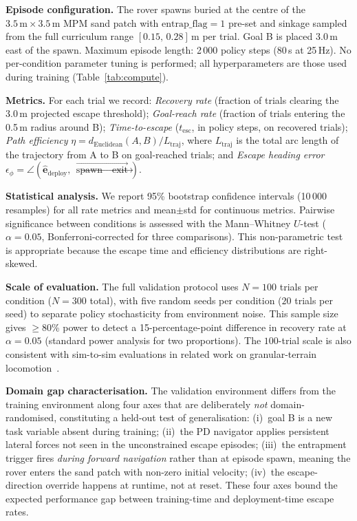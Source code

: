 \documentclass[conference]{IEEEtran}
\begin{document}
\textbf{Episode configuration.}
The rover spawns buried at the centre of the $3.5\,\text{m}\times3.5\,\text{m}$
MPM sand patch with $\text{entrap\_flag}=1$ pre-set and sinkage sampled from
the full curriculum range $[0.15,\,0.28]$\,m per trial. Goal B is placed
$3.0$\,m east of the spawn. Maximum episode length: 2\,000 policy steps
($80$\,s at 25\,Hz). No per-condition parameter tuning is performed; all
hyperparameters are those used during training (Table~\ref{tab:compute}).

\textbf{Metrics.}
For each trial we record: \emph{Recovery rate} (fraction of trials clearing
the 3.0\,m projected escape threshold); \emph{Goal-reach rate} (fraction of
trials entering the 0.5\,m radius around B); \emph{Time-to-escape}
($t_\text{esc}$, in policy steps, on recovered trials);
\emph{Path efficiency} $\eta = d_\text{Euclidean}(A,B) / L_\text{traj}$,
where $L_\text{traj}$ is the total arc length of the trajectory from A to B
on goal-reached trials; and \emph{Escape heading error}
$\epsilon_\phi = \angle(\hat{\mathbf{e}}_\text{deploy},
\,\overrightarrow{\text{spawn}\to\text{exit}})$.

\textbf{Statistical analysis.}
We report 95\% bootstrap confidence intervals (10\,000 resamples) for all
rate metrics and mean$\pm$std for continuous metrics.
Pairwise significance between conditions is assessed with the
Mann--Whitney $U$-test ($\alpha=0.05$, Bonferroni-corrected for three
comparisons). This non-parametric test is appropriate because the escape
time and efficiency distributions are right-skewed.

\textbf{Scale of evaluation.}
The full validation protocol uses $N=100$ trials per condition ($N=300$ total),
with five random seeds per condition ($20$ trials per seed) to separate policy
stochasticity from environment noise. This sample size gives ${\geq}80$\%
power to detect a 15-percentage-point difference in recovery rate at $\alpha=0.05$
(standard power analysis for two proportions). The $100$-trial scale is also
consistent with sim-to-sim evaluations in related work on granular-terrain
locomotion~\cite{andrychowicz2020learning}.

\textbf{Domain gap characterisation.}
The validation environment differs from the training environment along four
axes that are deliberately \emph{not} domain-randomised, constituting a
held-out test of generalisation:
(i)~goal B is a new task variable absent during training;
(ii)~the PD navigator applies persistent lateral forces not seen in the
unconstrained escape episodes;
(iii)~the entrapment trigger fires \emph{during forward navigation} rather than
at episode spawn, meaning the rover enters the sand patch with non-zero initial
velocity;
(iv)~the escape-direction override happens at runtime, not at reset.
These four axes bound the expected performance gap between training-time and
deployment-time escape rates.
\end{document}
